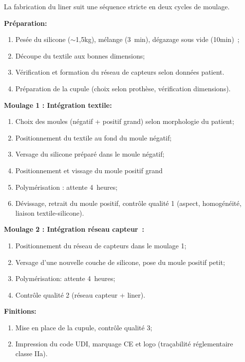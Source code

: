La fabrication du liner suit une séquence stricte en deux cycles de moulage.

\textbf{Préparation:}
\begin{enumerate}
  \item Pesée du silicone ($\sim$1,5kg), mélange (3~min), dégazage sous vide (10min)~;
  \item Découpe du textile aux bonnes dimensions;
  \item Vérification et formation du réseau de capteurs selon données patient.
  \item Préparation de la cupule (choix selon prothèse, vérification dimensions).
\end{enumerate}

\textbf{Moulage 1 : Intégration textile:}
\begin{enumerate}
  \item Choix des moules (négatif + positif grand) selon morphologie du patient;
  \item Positionnement du textile au fond du moule négatif;
  \item Versage du silicone préparé dans le moule négatif;
  \item Positionnement et vissage du moule positif grand~
  \item Polymérisation : attente 4~heures;
  \item Dévissage, retrait du moule positif, contrôle qualité 1 (aspect, homogénéité,
    liaison textile-silicone).
\end{enumerate}

\textbf{Moulage 2 : Intégration réseau capteur~:}
\begin{enumerate}[leftmargin=1.5em]
  \item Positionnement du réseau de capteurs dans le moulage 1;
  \item Versage d'une nouvelle couche de silicone, pose du moule positif petit;
  \item Polymérisation: attente 4~heures;
  \item Contrôle qualité 2 (réseau capteur + liner).
\end{enumerate}

\textbf{Finitions:}
\begin{enumerate}[leftmargin=1.5em]
  \item Mise en place de la cupule, contrôle qualité 3;
  \item Impression du code UDI, marquage CE et logo (traçabilité réglementaire classe IIa).
\end{enumerate}

